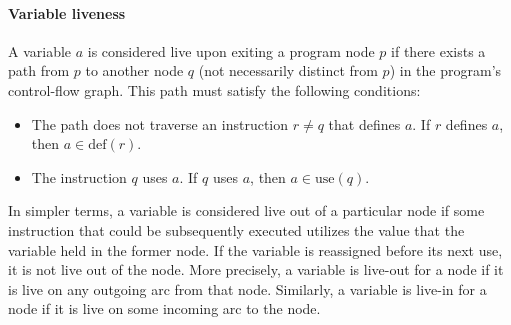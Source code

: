 \paragraph*{Variable liveness}

A variable $a$ is considered live upon exiting a program node $p$  if there exists a path from $p$ to another node $q$ (not necessarily distinct from $p$) in the program's control-flow graph. 
This path must satisfy the following conditions:
\begin{itemize}
    \item The path does not traverse an instruction $r \neq q$ that defines $a$. 
        If $r$ defines $a$, then $a \in \text{def}\left(r\right)$.
    \item The instruction $q$ uses $a$. 
        If $q$ uses $a$, then $a \in \text{use}\left(q\right)$.
\end{itemize}
In simpler terms, a variable is considered live out of a particular node if some instruction that could be subsequently executed utilizes the value that the variable held in the former node. 
If the variable is reassigned before its next use, it is not live out of the node. 
More precisely, a variable is live-out for a node if it is live on any outgoing arc from that node. 
Similarly, a variable is live-in for a node if it is live on some incoming arc to the node.

